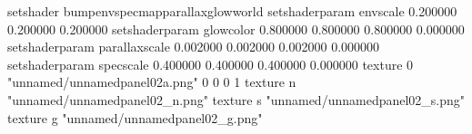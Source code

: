 setshader bumpenvspecmapparallaxglowworld
setshaderparam envscale 0.200000 0.200000 0.200000
setshaderparam glowcolor 0.800000 0.800000 0.800000 0.000000
setshaderparam parallaxscale 0.002000 0.002000 0.002000 0.000000
setshaderparam specscale 0.400000 0.400000 0.400000 0.000000
texture 0 "unnamed/unnamedpanel02a.png" 0 0 0 1
texture n "unnamed/unnamedpanel02_n.png"
texture s "unnamed/unnamedpanel02_s.png"
texture g "unnamed/unnamedpanel02_g.png"
